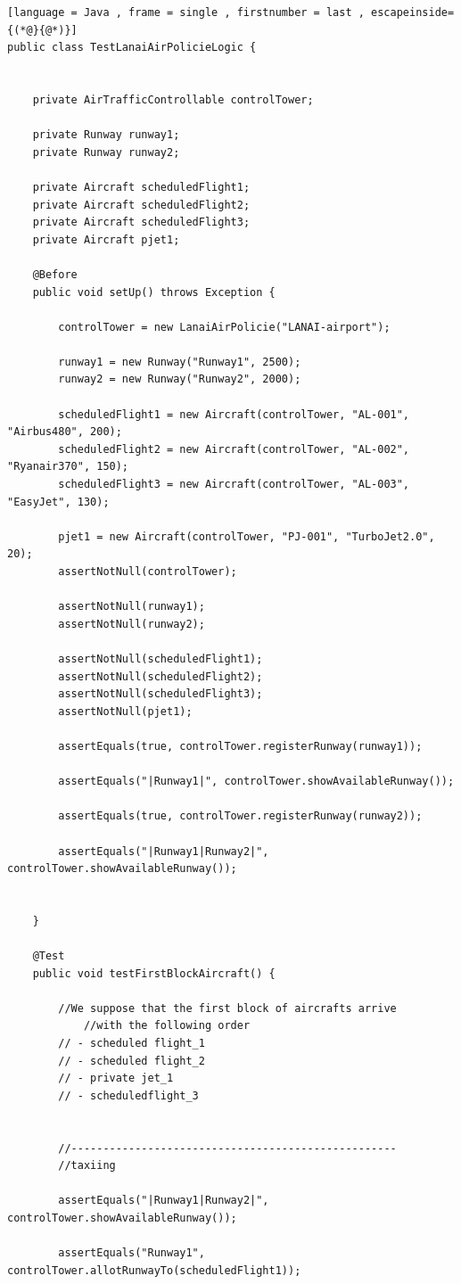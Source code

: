 \documentclass{article}
\begin{document}
\begin{sloppy}
\begin{lstlisting}[language = Java , frame = single , firstnumber = last , escapeinside={(*@}{@*)}]
public class TestLanaiAirPolicieLogic {


	private AirTrafficControllable controlTower;
	
	private Runway runway1;
	private Runway runway2;
	
	private Aircraft scheduledFlight1;
	private Aircraft scheduledFlight2;
	private Aircraft scheduledFlight3;
	private Aircraft pjet1;

	@Before
	public void setUp() throws Exception {
		
		controlTower = new LanaiAirPolicie("LANAI-airport");

		runway1 = new Runway("Runway1", 2500);
		runway2 = new Runway("Runway2", 2000);
		
		scheduledFlight1 = new Aircraft(controlTower, "AL-001", "Airbus480", 200);
		scheduledFlight2 = new Aircraft(controlTower, "AL-002", "Ryanair370", 150);
		scheduledFlight3 = new Aircraft(controlTower, "AL-003", "EasyJet", 130);
	
		pjet1 = new Aircraft(controlTower, "PJ-001", "TurboJet2.0", 20);		
		assertNotNull(controlTower);
		
		assertNotNull(runway1);
		assertNotNull(runway2);
		
		assertNotNull(scheduledFlight1);
		assertNotNull(scheduledFlight2);
		assertNotNull(scheduledFlight3);
		assertNotNull(pjet1);
		
		assertEquals(true, controlTower.registerRunway(runway1));

		assertEquals("|Runway1|", controlTower.showAvailableRunway());

		assertEquals(true, controlTower.registerRunway(runway2));

		assertEquals("|Runway1|Runway2|", controlTower.showAvailableRunway());

		
	}

	@Test
	public void testFirstBlockAircraft() {
		
		//We suppose that the first block of aircrafts arrive 
            //with the following order
		// - scheduled flight_1
		// - scheduled flight_2
		// - private jet_1
		// - scheduledflight_3
		
		
		//---------------------------------------------------
		//taxiing
		
		assertEquals("|Runway1|Runway2|", controlTower.showAvailableRunway());
		
		assertEquals("Runway1", controlTower.allotRunwayTo(scheduledFlight1));
		

\end{lstlisting}
\end{sloppy}
\end{document}
